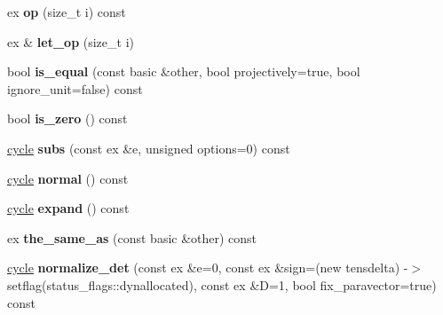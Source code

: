 \begin{DoxyCompactItemize}
\item 
\mbox{\label{class_moeb_inv_1_1cycle_a0574d28f1752ff262a7b04ca05208b2e}} 
ex {\bfseries op} (size\+\_\+t i) const
\item 
\mbox{\label{class_moeb_inv_1_1cycle_a07c8bf72a2f302fe559ca88774f627c1}} 
ex \& {\bfseries let\+\_\+op} (size\+\_\+t i)
\item 
\mbox{\label{class_moeb_inv_1_1cycle_ad479190eaee682f3d1d993c6c11a9e7e}} 
bool {\bfseries is\+\_\+equal} (const basic \&other, bool projectively=true, bool ignore\+\_\+unit=false) const
\item 
\mbox{\label{class_moeb_inv_1_1cycle_a9d20ab2167e22304fbe729b79947270c}} 
bool {\bfseries is\+\_\+zero} () const
\item 
\mbox{\label{class_moeb_inv_1_1cycle_aaa0d0ecddf008cafdc8b6d89d8bd1aa4}} 
\mbox{\hyperlink{class_moeb_inv_1_1cycle}{cycle}} {\bfseries subs} (const ex \&e, unsigned options=0) const
\item 
\mbox{\label{class_moeb_inv_1_1cycle_a24f997864816a04fb22b94617540a3bc}} 
\mbox{\hyperlink{class_moeb_inv_1_1cycle}{cycle}} {\bfseries normal} () const
\item 
\mbox{\label{class_moeb_inv_1_1cycle_ad03cc19319b3cb1131a58644b1864104}} 
\mbox{\hyperlink{class_moeb_inv_1_1cycle}{cycle}} {\bfseries expand} () const
\item 
\mbox{\label{class_moeb_inv_1_1cycle_af0209835b95128c1096b8b0d4837ed76}} 
ex {\bfseries the\+\_\+same\+\_\+as} (const basic \&other) const
\item 
\mbox{\label{class_moeb_inv_1_1cycle_a98b8dd398f4e762adaf084a6c928d12a}} 
\mbox{\hyperlink{class_moeb_inv_1_1cycle}{cycle}} {\bfseries normalize\+\_\+det} (const ex \&e=0, const ex \&sign=(new tensdelta) -\/$>$setflag(status\+\_\+flags\+::dynallocated), const ex \&D=1, bool fix\+\_\+paravector=true) const
\item 
\mbox{\label{class_moeb_inv_1_1cycle_aa90c676e4a9f1c790ed57fb3a308246c}} 

\end{DoxyCompactItemize}
